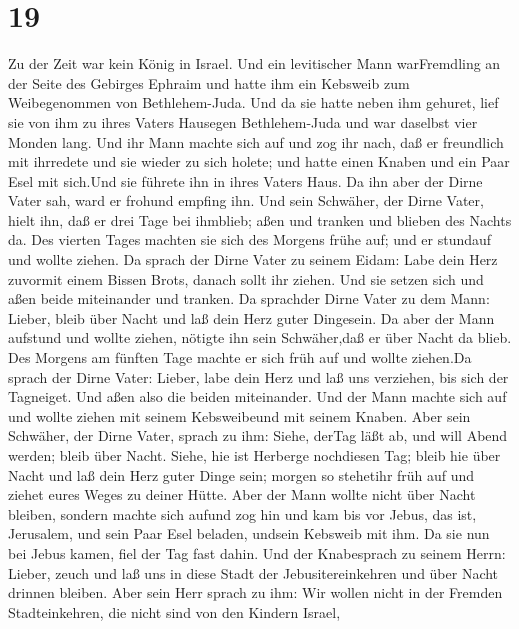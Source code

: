 \hypertarget{section-18}{%
\section{19}\label{section-18}}

 Zu der Zeit war kein König in Israel. Und ein levitischer
Mann warFremdling an der Seite des Gebirges Ephraim und hatte ihm ein
Kebsweib zum Weibegenommen von Bethlehem-Juda.  Und da sie
hatte neben ihm gehuret, lief sie von ihm zu ihres Vaters Hausegen
Bethlehem-Juda und war daselbst vier Monden lang.  Und ihr
Mann machte sich auf und zog ihr nach, daß er freundlich mit ihrredete
und sie wieder zu sich holete; und hatte einen Knaben und ein Paar Esel
mit sich.Und sie führete ihn in ihres Vaters Haus. Da ihn aber der Dirne
Vater sah, ward er frohund empfing ihn.  Und sein Schwäher,
der Dirne Vater, hielt ihn, daß er drei Tage bei ihmblieb; aßen und
tranken und blieben des Nachts da.  Des vierten Tages
machten sie sich des Morgens frühe auf; und er stundauf und wollte
ziehen. Da sprach der Dirne Vater zu seinem Eidam: Labe dein Herz
zuvormit einem Bissen Brots, danach sollt ihr ziehen.  Und
sie setzen sich und aßen beide miteinander und tranken. Da sprachder
Dirne Vater zu dem Mann: Lieber, bleib über Nacht und laß dein Herz
guter Dingesein.  Da aber der Mann aufstund und wollte
ziehen, nötigte ihn sein Schwäher,daß er über Nacht da blieb.
 Des Morgens am fünften Tage machte er sich früh auf und
wollte ziehen.Da sprach der Dirne Vater: Lieber, labe dein Herz und laß
uns verziehen, bis sich der Tagneiget. Und aßen also die beiden
miteinander.  Und der Mann machte sich auf und wollte ziehen
mit seinem Kebsweibeund mit seinem Knaben. Aber sein Schwäher, der Dirne
Vater, sprach zu ihm: Siehe, derTag läßt ab, und will Abend werden;
bleib über Nacht. Siehe, hie ist Herberge nochdiesen Tag; bleib hie über
Nacht und laß dein Herz guter Dinge sein; morgen so stehetihr früh auf
und ziehet eures Weges zu deiner Hütte.  Aber der Mann
wollte nicht über Nacht bleiben, sondern machte sich aufund zog hin und
kam bis vor Jebus, das ist, Jerusalem, und sein Paar Esel beladen,
undsein Kebsweib mit ihm.  Da sie nun bei Jebus kamen, fiel
der Tag fast dahin. Und der Knabesprach zu seinem Herrn: Lieber, zeuch
und laß uns in diese Stadt der Jebusitereinkehren und über Nacht drinnen
bleiben.  Aber sein Herr sprach zu ihm: Wir wollen nicht in
der Fremden Stadteinkehren, die nicht sind von den Kindern Israel,
